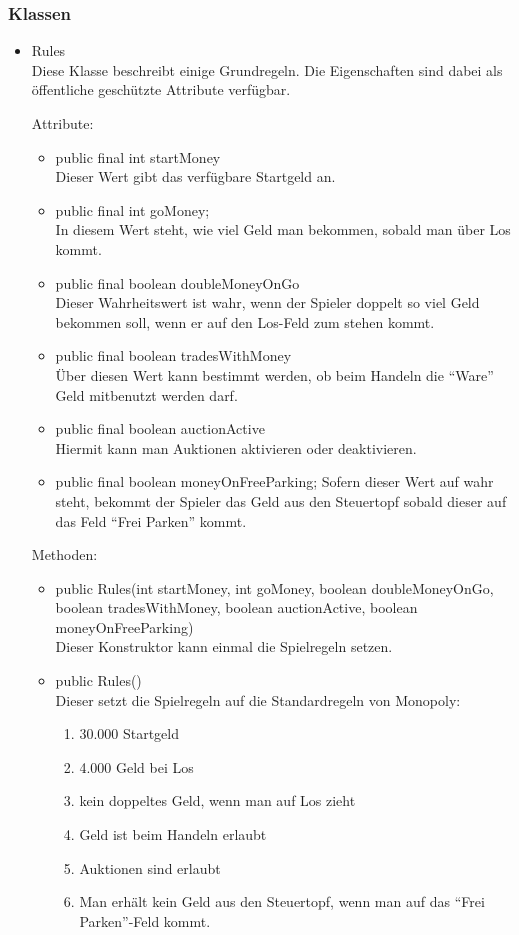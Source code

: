 \documentclass[a4paper,10pt]{article}
\begin{document}
\subsubsection{Klassen}
\begin{itemize}
\item Rules \\
Diese Klasse beschreibt einige Grundregeln. Die Eigenschaften sind dabei als öffentliche geschützte Attribute verfügbar.

Attribute:
\begin{itemize}
\item public final int startMoney \\
Dieser Wert gibt das verfügbare Startgeld an.
\item public final int goMoney; \\
In diesem Wert steht, wie viel Geld man bekommen, sobald man über Los kommt.
\item public final boolean doubleMoneyOnGo \\
Dieser Wahrheitswert ist wahr, wenn der Spieler doppelt so viel Geld bekommen soll, wenn er auf den Los-Feld zum stehen kommt.
\item public final boolean tradesWithMoney \\
Über diesen Wert kann bestimmt werden, ob beim Handeln die "`Ware"' Geld mitbenutzt werden darf.
\item public final boolean auctionActive \\
Hiermit kann man Auktionen aktivieren oder deaktivieren.
\item public final boolean moneyOnFreeParking;
Sofern dieser Wert auf wahr steht, bekommt der Spieler das Geld aus den Steuertopf sobald dieser auf das Feld "`Frei Parken"' kommt.
\end{itemize}

Methoden:
\begin{itemize}
\item public Rules(int startMoney, int goMoney, boolean doubleMoneyOnGo, boolean tradesWithMoney, boolean auctionActive, boolean moneyOnFreeParking) \\
Dieser Konstruktor kann einmal die Spielregeln setzen.
\item public Rules() \\
Dieser setzt die Spielregeln auf die Standardregeln von Monopoly:
\begin{enumerate}
\item 30.000 Startgeld
\item 4.000 Geld bei Los
\item kein doppeltes Geld, wenn man auf Los zieht
\item Geld ist beim Handeln erlaubt
\item Auktionen sind erlaubt
\item Man erhält kein Geld aus den Steuertopf, wenn man auf das "`Frei Parken"'-Feld kommt.
\end{enumerate}
\end{itemize}
\end{itemize} %
\end{document}
